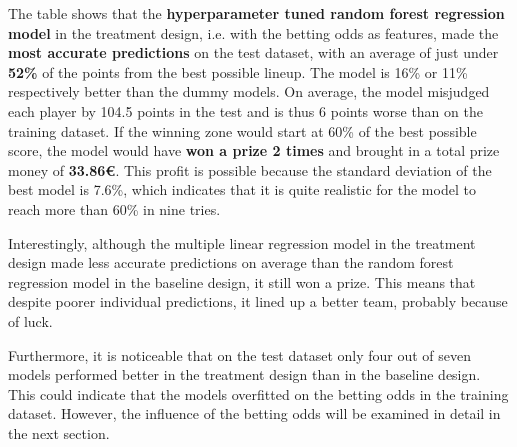 The table shows that the \textbf{hyperparameter tuned random forest regression model} in the treatment design, i.e. with the betting odds as features, made the \textbf{most accurate predictions} on the test dataset, with an average of just under \textbf{52\%} of the points from the best possible lineup. The model is 16\% or 11\% respectively better than the dummy models. On average, the model misjudged each player by 104.5 points in the test and is thus 6 points worse than on the training dataset. If the winning zone would start at 60\% of the best possible score, the model would have \textbf{won a prize 2 times} and brought in a total prize money of \textbf{33.86€}. This profit is possible because the standard deviation of the best model is 7.6\%, which indicates that it is quite realistic for the model to reach more than 60\% in nine tries.

Interestingly, although the multiple linear regression model in the treatment design made less accurate predictions on average than the random forest regression model in the baseline design, it still won a prize. This means that despite poorer individual predictions, it lined up a better team, probably because of luck.

Furthermore, it is noticeable that on the test dataset only four out of seven models performed better in the treatment design than in the baseline design. This could indicate that the models overfitted on the betting odds in the training dataset. However, the influence of the betting odds will be examined in detail in the next section.






